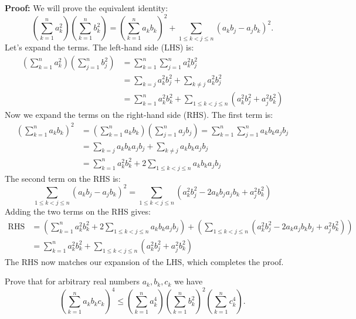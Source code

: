 \textbf{Proof:}
We will prove the equivalent identity:
\[
\left( \sum_{k=1}^n a_k^2 \right)\left( \sum_{k=1}^n b_k^2 \right) = \left( \sum_{k=1}^n a_k b_k \right)^2 + \sum_{1 \leq k < j \leq n} (a_k b_j - a_j b_k)^2.
\]
Let's expand the terms. The left-hand side (LHS) is:
\begin{align*}
\left( \sum_{k=1}^n a_k^2 \right)\left( \sum_{j=1}^n b_j^2 \right) &= \sum_{k=1}^n \sum_{j=1}^n a_k^2 b_j^2 \\
&= \sum_{k=j} a_k^2 b_j^2 + \sum_{k \neq j} a_k^2 b_j^2 \\
&= \sum_{k=1}^n a_k^2 b_k^2 + \sum_{1 \leq k < j \leq n} (a_k^2 b_j^2 + a_j^2 b_k^2)
\end{align*}
Now we expand the terms on the right-hand side (RHS). The first term is:
\begin{align*}
\left( \sum_{k=1}^n a_k b_k \right)^2 &= \left( \sum_{k=1}^n a_k b_k \right)\left( \sum_{j=1}^n a_j b_j \right) = \sum_{k=1}^n \sum_{j=1}^n a_k b_k a_j b_j \\
&= \sum_{k=j} a_k b_k a_j b_j + \sum_{k \neq j} a_k b_k a_j b_j \\
&= \sum_{k=1}^n a_k^2 b_k^2 + 2 \sum_{1 \leq k < j \leq n} a_k b_k a_j b_j
\end{align*}
The second term on the RHS is:
\[
\sum_{1 \leq k < j \leq n} (a_k b_j - a_j b_k)^2 = \sum_{1 \leq k < j \leq n} (a_k^2 b_j^2 - 2a_k b_j a_j b_k + a_j^2 b_k^2)
\]
Adding the two terms on the RHS gives:
\begin{align*}
\text{RHS} &= \left( \sum_{k=1}^n a_k^2 b_k^2 + 2 \sum_{1 \leq k < j \leq n} a_k b_k a_j b_j \right) + \left( \sum_{1 \leq k < j \leq n} (a_k^2 b_j^2 - 2a_k a_j b_k b_j + a_j^2 b_k^2) \right) \\
&= \sum_{k=1}^n a_k^2 b_k^2 + \sum_{1 \leq k < j \leq n} (a_k^2 b_j^2 + a_j^2 b_k^2)
\end{align*}
The RHS now matches our expansion of the LHS, which completes the proof.


\begin{problembox}
Prove that for arbitrary real numbers \( a_k, b_k, c_k \) we have
\[
\left( \sum_{k=1}^n a_k b_k c_k \right)^4 \leq
\left( \sum_{k=1}^n a_k^4 \right)
\left( \sum_{k=1}^n b_k^2 \right)^2
\left( \sum_{k=1}^n c_k^4 \right).
\]
\end{problembox}

